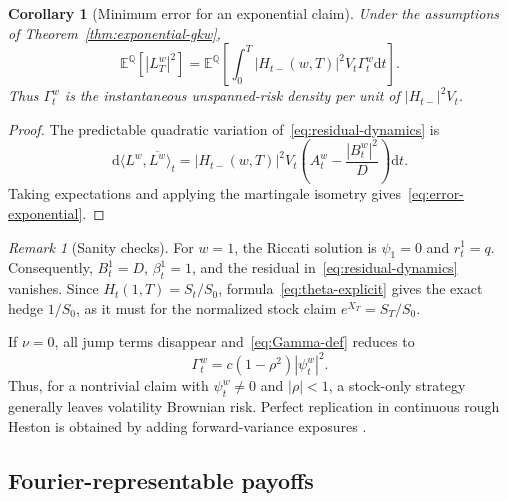\documentclass[11pt]{article}
\newtheorem{corollary}[theorem]{Corollary}
\theoremstyle{definition}
\theoremstyle{remark}
\newtheorem{remark}[theorem]{Remark}
\newcommand{\E}{\mathbb{E}}
\newcommand{\Q}{\mathbb{Q}}
\newcommand{\1}{\mathbf{1}}
\newcommand{\dd}{\mathrm{d}}
\begin{document}
\begin{corollary}[Minimum error for an exponential claim]
\label{cor:error-exponential}
Under the assumptions of Theorem~\ref{thm:exponential-gkw},
\begin{equation}
\label{eq:error-exponential}
 \E^\Q[|L_T^w|^2]
 =\E^\Q\left[
   \int_0^T|H_{t-}(w,T)|^2V_t\Gamma_t^w\dd t
 \right].
\end{equation}
Thus $\Gamma_t^w$ is the instantaneous unspanned-risk density per unit of
$|H_{t-}|^2V_t$.
\end{corollary}

\begin{proof}
The predictable quadratic variation of~\eqref{eq:residual-dynamics} is
\[
 \dd\langle L^w,\overline{L^w}\rangle_t
 =|H_{t-}(w,T)|^2V_t
 \left(A_t^w-\frac{|B_t^w|^2}{D}\right)\dd t.
\]
Taking expectations and applying the martingale isometry
gives~\eqref{eq:error-exponential}.
\end{proof}

\begin{remark}[Sanity checks]
For $w=1$, the Riccati solution is $\psi_1=0$ and $r_t^1=q$. Consequently,
$B_t^1=D$, $\beta_t^1=1$, and the residual
in~\eqref{eq:residual-dynamics} vanishes. Since $H_t(1,T)=S_t/S_0$,
formula~\eqref{eq:theta-explicit} gives the exact hedge $1/S_0$, as it must for
the normalized stock claim $e^{X_T}=S_T/S_0$.

If $\nu=0$, all jump terms disappear and~\eqref{eq:Gamma-def} reduces to
\[
 \Gamma_t^w=c(1-\rho^2)|\psi_t^w|^2.
\]
Thus, for a nontrivial claim with $\psi_t^w\ne0$ and $|\rho|<1$, a stock-only
strategy generally leaves volatility Brownian risk. Perfect replication in
continuous rough Heston is obtained by adding forward-variance exposures
\citep{eleuchrosenbaum2018}.
\end{remark}

\subsection{Fourier-representable payoffs}
\end{document}
